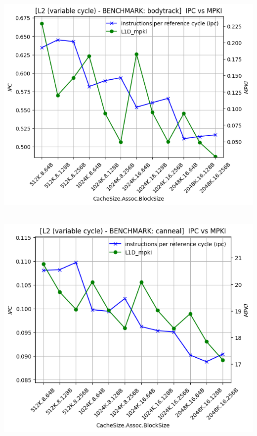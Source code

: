 \begin{minipage}{\textwidth}
    \begin{center}
        \\
        \vspace{3mm}
        \includegraphics[scale=0.65]{graphs/L2/var/bodytrack.png}
        \vspace{6mm}
    \end{center}
\end{minipage}

\begin{minipage}{\textwidth}
    \begin{center}
        \\
        \vspace{3mm}
        \includegraphics[scale=0.65]{graphs/L2/var/canneal.png}
        \vspace{6mm}
    \end{center}
\end{minipage}

